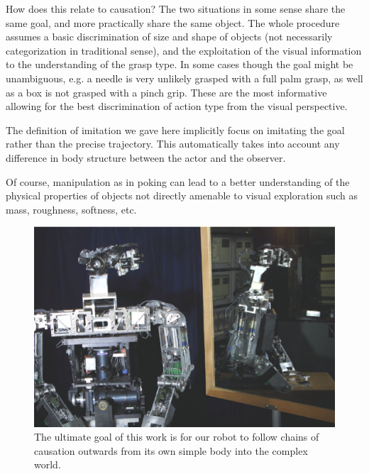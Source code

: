 \ifverbose
How does this relate to causation?  The two situations in some sense
share the same goal, and more practically share the same object.  The
whole procedure assumes a basic discrimination of size and shape of
objects (not necessarily categorization in traditional sense), and the
exploitation of the visual information to the understanding of the
grasp type. In some cases though the goal might be unambiguous, e.g. a
needle is very unlikely grasped with a full palm grasp, as well as a
box is not grasped with a pinch grip. These are the most informative
allowing for the best discrimination of action type from the visual
perspective.
\fi

\ifverbose
The definition of imitation we gave here implicitly focus on imitating
the goal rather than the precise trajectory. This automatically takes
into account any difference in body structure between the actor and
the observer.

Of course, manipulation as in poking can lead to a better
understanding of the physical properties of objects not directly
amenable to visual exploration such as mass, roughness, softness, etc.
\fi

\ifverbose
\begin{figure}[tbh]
\begin{center}
\includegraphics[width=\columnwidth]{mirror-cog.eps}
\caption{ 
\label{fig:mirror-cog}
%
The ultimate goal of this work is for our robot to follow chains of
causation outwards from its own simple body into the complex world.
%
}
\end{center}
\end{figure}
\fi
